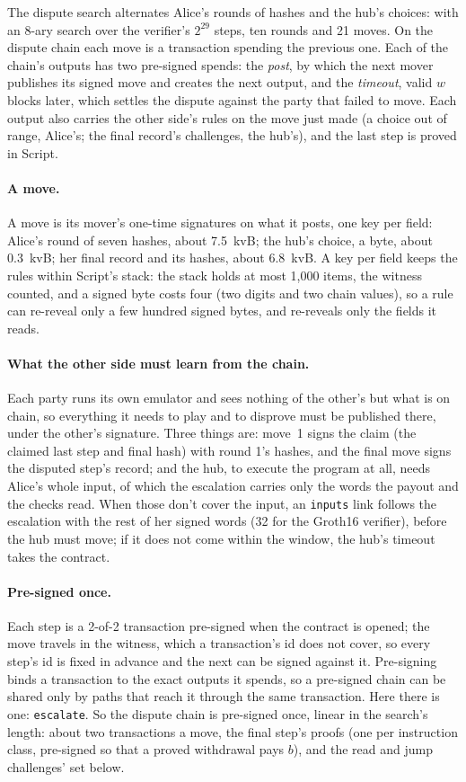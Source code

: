 \documentclass[11pt]{article}
\newcommand{\tx}[1]{\texttt{#1}}
\begin{document}
The dispute search alternates Alice's rounds of hashes and the hub's choices:
with an 8-ary search over the verifier's $2^{29}$ steps, ten rounds and
21 moves. On the dispute chain each move is a transaction spending the previous
one. Each of the chain's outputs has two pre-signed spends: the
\emph{post}, by which the next mover publishes its signed move and
creates the next output, and the \emph{timeout}, valid $w$ blocks later,
which settles the dispute against the party that failed to move. Each
output also carries the other side's rules on the move just made (a
choice out of range, Alice's; the final record's challenges, the hub's),
and the last step is proved in Script.

\paragraph{A move.} A move is its mover's one-time signatures on what it
posts, one key per field: Alice's round of seven hashes, about 7.5~kvB;
the hub's choice, a byte, about 0.3~kvB; her final record and its hashes,
about 6.8~kvB. A key per field keeps the rules within Script's stack:
the stack holds at most 1,000 items, the witness counted, and a signed
byte costs four (two digits and two chain values), so a rule can
re-reveal only a few hundred signed bytes, and re-reveals only the fields
it reads.

\paragraph{What the other side must learn from the chain.} Each party
runs its own emulator and sees nothing of the other's but what is on
chain, so everything it needs to play and to disprove must be published
there, under the other's signature. Three things are: move~1 signs the
claim (the claimed last step and final hash) with round 1's hashes, and
the final move signs the disputed step's record; and the hub, to execute
the program at all, needs Alice's whole input, of which the escalation
carries only the words the payout and the checks read. When those don't
cover the input, an \tx{inputs} link follows the escalation with the
rest of her signed words (32 for the Groth16 verifier), before the hub
must move; if it does not come within the window, the hub's timeout
takes the contract.

\paragraph{Pre-signed once.} Each step is a 2-of-2 transaction
pre-signed when the contract is opened; the move travels in the witness,
which a transaction's id does not cover, so every step's id is fixed in
advance and the next can be signed against it. Pre-signing binds a
transaction to the exact outputs it spends, so a pre-signed chain can be
shared only by paths that reach it through the same transaction. Here
there is one: \tx{escalate}. So the dispute chain is pre-signed once, linear in
the search's length: about two transactions a move, the final step's
proofs (one per instruction class, pre-signed so that a proved
withdrawal pays $b$), and the read and jump challenges' set
below.
\end{document}
